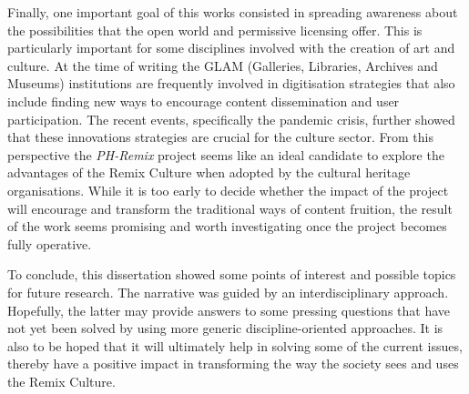 Finally, one important goal of this works consisted in spreading awareness about the possibilities that the open world and permissive licensing offer. This is particularly important for some disciplines involved with the creation of art and culture. At the time of writing the GLAM (Galleries, Libraries, Archives and Museums) institutions are frequently involved in digitisation strategies that also include finding new ways to encourage content dissemination and user participation. The recent events, specifically the pandemic crisis, further showed that these innovations strategies are crucial for the culture sector.
From this perspective the \emph{PH-Remix} project seems like an ideal candidate to explore the advantages of the Remix Culture when adopted by the cultural heritage organisations. While it is too early to decide whether the impact of the project will encourage and transform the traditional ways of content fruition, the result of the work seems promising and worth investigating once the project becomes fully operative.

To conclude, this dissertation showed some points of interest and possible topics for future research. The narrative was guided by an interdisciplinary approach. Hopefully, the latter may provide answers to some pressing questions that have not yet been solved by using more generic discipline-oriented approaches. It is also to be hoped that it will ultimately help in solving some of the current issues, thereby have a positive impact in transforming the way the society sees and uses the Remix Culture.